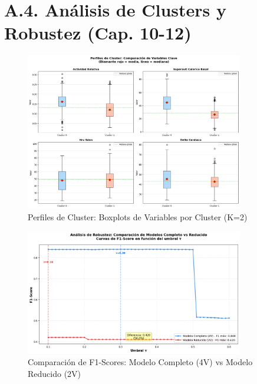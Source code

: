 \documentclass[12pt,letterpaper,twoside]{report}
\begin{document}
\clearpage

\section*{A.4. Análisis de Clusters y Robustez (Cap. 10-12)}

\begin{figure}[H]
\centering
\includegraphics[width=0.85\textwidth]{figuras/cluster_profiles_boxplots.png}
\caption{Perfiles de Cluster: Boxplots de Variables por Cluster (K=2)}
\end{figure}

\begin{figure}[H]
\centering
\includegraphics[width=0.85\textwidth]{figuras/comparativa_f1_scores.png}
\caption{Comparación de F1-Scores: Modelo Completo (4V) vs Modelo Reducido (2V)}
\end{figure}

\clearpage
\end{document}
